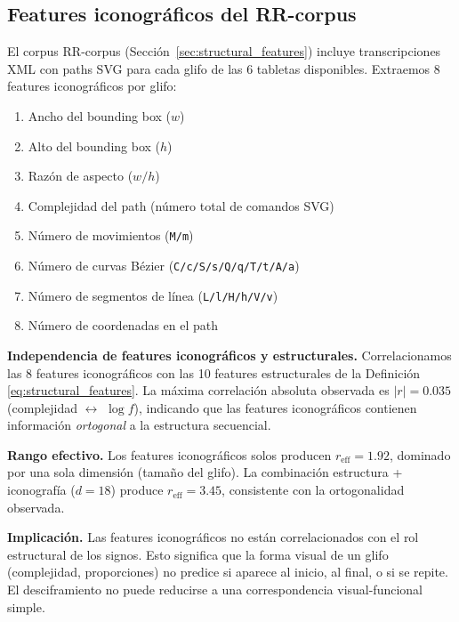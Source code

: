 \documentclass[11pt,a4paper]{article}
\newcommand{\1}{\mathbf{1}}
\numberwithin{equation}{section}
\begin{document}
\subsection{Features iconográficos del RR-corpus}
\label{sec:iconographic}

El corpus RR-corpus (Sección~\ref{sec:structural_features}) incluye transcripciones XML con paths SVG para cada glifo de las 6 tabletas disponibles. Extraemos 8 features iconográficos por glifo:

\begin{enumerate}
    \item Ancho del bounding box ($w$)
    \item Alto del bounding box ($h$)
    \item Razón de aspecto ($w/h$)
    \item Complejidad del path (número total de comandos SVG)
    \item Número de movimientos (\texttt{M/m})
    \item Número de curvas Bézier (\texttt{C/c/S/s/Q/q/T/t/A/a})
    \item Número de segmentos de línea (\texttt{L/l/H/h/V/v})
    \item Número de coordenadas en el path
\end{enumerate}

\textbf{Independencia de features iconográficos y estructurales.} Correlacionamos las 8 features iconográficos con las 10 features estructurales de la Definición \ref{eq:structural_features}. La máxima correlación absoluta observada es $|r| = 0.035$ (complejidad $\leftrightarrow$ $\log f$), indicando que las features iconográficos contienen información \emph{ortogonal} a la estructura secuencial.

\textbf{Rango efectivo.} Los features iconográficos solos producen $r_{\text{eff}} = 1.92$, dominado por una sola dimensión (tamaño del glifo). La combinación estructura + iconografía ($d=18$) produce $r_{\text{eff}} = 3.45$, consistente con la ortogonalidad observada.

\textbf{Implicación.} Las features iconográficos no están correlacionados con el rol estructural de los signos. Esto significa que la forma visual de un glifo (complejidad, proporciones) no predice si aparece al inicio, al final, o si se repite. El desciframiento no puede reducirse a una correspondencia visual-funcional simple.
\end{document}
